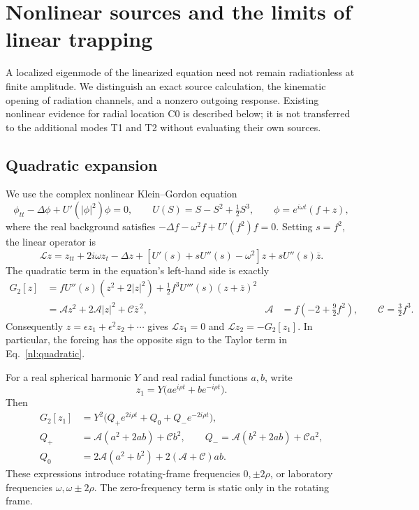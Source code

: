 \section{Nonlinear sources and the limits of linear trapping}
\label{nl:section}

A localized eigenmode of the linearized equation need not remain
radiationless at finite amplitude. We distinguish an exact source
calculation, the kinematic opening of radiation channels, and a nonzero
outgoing response. Existing nonlinear evidence for radial location C0
is described below; it is not transferred to the additional modes T1
and T2 without evaluating their own sources.

\subsection{Quadratic expansion}
\label{nl:expansion}
We use the complex nonlinear Klein--Gordon equation
\begin{equation}
 \phi_{tt}-\Delta\phi+U'(|\phi|^2)\phi=0,
 \qquad U(S)=S-S^2+\tfrac12 S^3,
 \qquad \phi=e^{i\omega t}(f+z),
 \label{nl:model}
\end{equation}
where the real background satisfies
$-\Delta f-\omega^2f+U'(f^2)f=0$. Setting $s=f^2$, the linear operator is
\begin{equation}
 \mathcal Lz=z_{tt}+2i\omega z_t-\Delta z
 +[U'(s)+sU''(s)-\omega^2]z+sU''(s)\overline z.
 \label{nl:linear}
\end{equation}
The quadratic term in the equation's left-hand side is exactly
\begin{align}
 G_2[z]&=fU''(s)(z^2+2|z|^2)
       +\tfrac12 f^3U'''(s)(z+\overline z)^2 \nonumber\\
       &=\mathcal A z^2+2\mathcal A|z|^2+\mathcal C\overline z^{\,2},
 &\mathcal A&=f\left(-2+\tfrac92f^2\right),
 \qquad \mathcal C=\tfrac32f^3.
 \label{nl:quadratic}
\end{align}
Consequently $z=\epsilon z_1+\epsilon^2z_2+\cdots$ gives
$\mathcal Lz_1=0$ and $\mathcal Lz_2=-G_2[z_1]$. In particular, the
forcing has the opposite sign to the Taylor term in
Eq.~\eqref{nl:quadratic}.

For a real spherical harmonic $Y$ and real radial functions $a,b$, write
\begin{equation}
 z_1=Y\bigl(ae^{i\rho t}+be^{-i\rho t}\bigr).
\end{equation}
Then
\begin{align}
 G_2[z_1]&=Y^2\bigl(Q_+e^{2i\rho t}+Q_0+Q_-e^{-2i\rho t}\bigr),\\
 Q_+&=\mathcal A(a^2+2ab)+\mathcal Cb^2,\qquad
 Q_-=\mathcal A(b^2+2ab)+\mathcal Ca^2,\\
 Q_0&=2\mathcal A(a^2+b^2)+2(\mathcal A+\mathcal C)ab.
 \label{nl:coefficients}
\end{align}
These expressions introduce rotating-frame frequencies $0,\pm2\rho$,
or laboratory frequencies $\omega,\omega\pm2\rho$. The zero-frequency
term is static only in the rotating frame.

